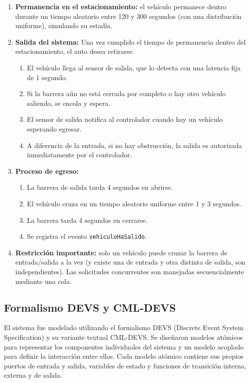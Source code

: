 \documentclass[12pt]{article}
\begin{document}
\begin{enumerate}
    \item \textbf{Permanencia en el estacionamiento:} el vehículo permanece dentro durante un tiempo aleatorio entre 120 y 300 segundos (con una distribución uniforme), simulando su estadía.

    \item \textbf{Salida del sistema:} Una vez cumplido el tiempo de permanencia dentro del estacionamiento, el auto desea retirarse.
    \begin{enumerate}
        \item El vehículo llega al sensor de salida, que lo detecta con una latencia fija de 1 segundo.
        \item Si la barrera aún no está cerrada por completo o hay otro vehículo saliendo, se encola y espera.
        \item El sensor de salida notifica al controlador cuando hay un vehículo esperando egresar.
        \item A diferencia de la entrada, si no hay obstrucción, la salida es autorizada inmediatamente por el controlador.
    \end{enumerate}

    \item \textbf{Proceso de egreso:}
    \begin{enumerate}
        \item La barrera de salida tarda 4 segundos en abrirse.
        \item El vehículo cruza en un tiempo aleatorio uniforme entre 1 y 3 segundos.
        \item La barrera tarda 4 segundos en cerrarse.
        \item Se registra el evento \texttt{vehiculoHaSalido}.
    \end{enumerate}

    \item \textbf{Restricción importante:} solo un vehículo puede cruzar la barrera de entrada/salida a la vez (y existe una de entrada y otra distinta de salida, son independientes). Las solicitudes concurrentes son manejadas secuencialmente mediante una cola.
\end{enumerate}


\subsection{Formalismo DEVS y CML‐DEVS}

El sistema fue modelado utilizando el formalismo DEVS (Discrete Event System Specification) y su variante textual CML-DEVS. Se diseñaron modelos atómicos para representar los componentes individuales del sistema y un modelo acoplado para definir la interacción entre ellos. Cada modelo atómico contiene sus propios puertos de entrada y salida, variables de estado y funciones de transición interna, externa y de salida.
\end{document}
